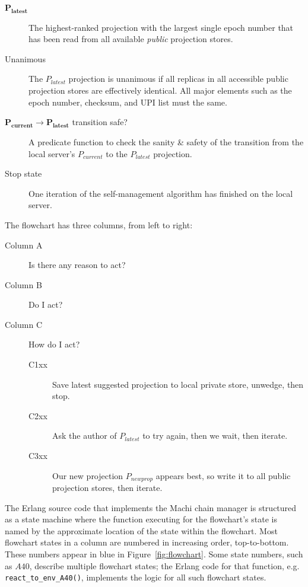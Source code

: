 \documentclass[preprint,10pt]{sigplanconf}
\begin{document}
\begin{description}
\item[$\mathbf{P_{latest}}$] The highest-ranked projection with the largest
  single epoch number that has been read from all available {\em public}
  projection stores.

\item[Unanimous] The $P_{latest}$ projection is unanimous if all
  replicas in all accessible public projection stores are effectively
  identical.  All major elements such as the epoch number, checksum,
  and UPI list must the same.

\item[$\mathbf{P_{current} \rightarrow P_{latest}}$ transition safe?]
  A predicate function to
  check the sanity \& safety of the transition from the local server's
  $P_{current}$ to the $P_{latest}$ projection.

\item[Stop state] One iteration of the self-management algorithm has
  finished on the local server.
\end{description}

The flowchart has three columns, from left to right:

\begin{description}
\item[Column A] Is there any reason to act?
\item[Column B] Do I act?
\item[Column C] How do I act?
  \begin{description}
  \item[C1xx] Save latest suggested projection to local private store, unwedge,
    then stop.
  \item[C2xx] Ask the author of $P_{latest}$ to try again, then we wait,
    then iterate.
  \item[C3xx] Our new projection $P_{newprop}$ appears best, so write it
    to all public projection stores, then iterate.
  \end{description}
\end{description}

The Erlang source code that implements the Machi chain manager is
structured as a state machine where the function executing for the
flowchart's state is named by the approximate location of the state
within the flowchart.
Most flowchart states in a column are numbered in increasing order,
top-to-bottom.  These numbers appear in blue in
Figure~\ref{fig:flowchart}.  Some state numbers, such as $A40$,
describe multiple flowchart states; the Erlang code for that function,
e.g. {\tt react\_to\_\-env\_A40()}, implements the logic for all such
flowchart states.
\end{document}
